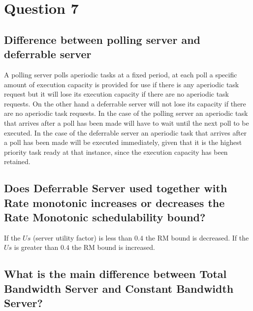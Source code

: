 \section{Question 7}

    \subsection{Difference between polling server and deferrable server}
        A polling server polls aperiodic tasks at a fixed period, at each poll a specific amount of execution capacity is provided for use if there is any aperiodic task request but it will lose its execution capacity if there are no aperiodic task requests. On the other hand a deferrable server will not lose its capacity if there are no aperiodic task requests. In the case of the polling server an aperiodic task that arrives after a poll has been made will have to wait until the next poll to be executed. In the case of the deferrable server an aperiodic task that arrives after a poll has been made will be executed immediately, given that it is the highest priority task ready at that instance, since the execution capacity has been retained.\\

    \subsection{Does Deferrable Server used together with Rate monotonic increases or decreases the Rate Monotonic schedulability bound?}
        If the $Us$ (server utility factor) is less than $0.4$ the RM bound is decreased. If the $Us$ is greater than $0.4$ the RM bound is increased.\\

    \subsection{What is the main difference between Total Bandwidth Server and Constant Bandwidth Server?}
        